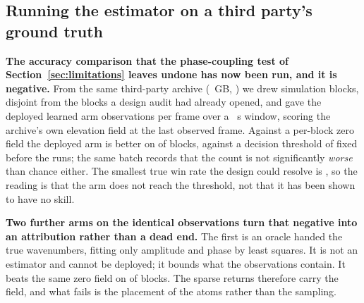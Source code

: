 \documentclass[review]{elsarticle}
\begin{document}
\subsection{Running the estimator on a third party's ground truth}
\label{sec:res_extacc}

\textbf{The accuracy comparison that the phase-coupling test of
Section~\ref{sec:limitations} leaves undone has now been run, and it is negative.}
From the same third-party archive (\TOneGB{}~GB, \TOneCite{}) we drew \TElevenN{}
simulation blocks, disjoint from the blocks a design audit had already opened, and
gave the deployed learned arm \TElevenDensity{} observations per frame over a
\TElevenSpan{}~s window, scoring the archive's own elevation field at the last
observed frame. Against a per-block zero field the deployed arm is better on
\TElevenShipWin{} of \TElevenN{} blocks, against a decision threshold of
\TElevenThresh{} fixed before the runs; the same batch records that the count is not
significantly \emph{worse} than chance either. The smallest true win rate the design
could resolve is \TElevenMDE{}, so the reading is that the arm does not reach the
threshold, not that it has been shown to have no skill.

\textbf{Two further arms on the identical observations turn that negative into an
attribution rather than a dead end.} The first is an oracle handed the true
wavenumbers, fitting only amplitude and phase by least squares. It is not an
estimator and cannot be deployed; it bounds what the observations contain. It beats
the same zero field on \TElevenOracleWin{} of \TElevenN{} blocks. The sparse returns
therefore carry the field, and what fails is the placement of the atoms rather than
the sampling.
\end{document}
